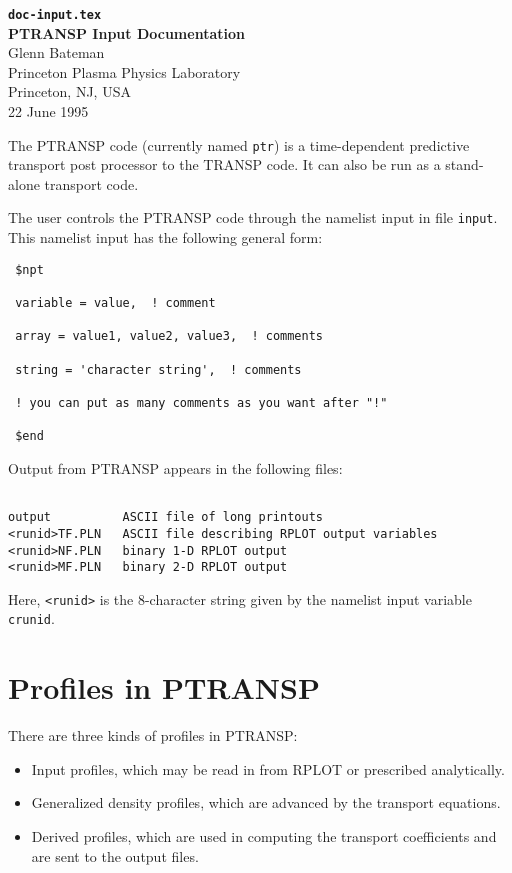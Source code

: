 \headheight 0pt  \headsep 0pt  \topmargin 0pt  \oddsidemargin 0pt
\textheight 9.0in  \textwidth 6.5in
\renewcommand{\arraystretch}{2.0}

\begin{center} 
{\bf {\tt doc-input.tex} \\
PTRANSP Input Documentation} \\
\vspace{1pc} Glenn Bateman \\
Princeton Plasma Physics Laboratory \\ Princeton, NJ, USA \\
22 June 1995
\end{center}

The PTRANSP code (currently named {\tt ptr}) 
is a time-dependent predictive transport post
processor to the TRANSP code.  It can also be run as a stand-alone
transport code.

The user controls the PTRANSP code through the namelist input in file
{\tt input}.  This namelist input has the following general form:
\begin{verbatim}
 $npt
 
 variable = value,  ! comment
 
 array = value1, value2, value3,  ! comments
 
 string = 'character string',  ! comments
 
 ! you can put as many comments as you want after "!"
 
 $end
\end{verbatim}

Output from PTRANSP appears in the following files:
\begin{verbatim}

output          ASCII file of long printouts
<runid>TF.PLN   ASCII file describing RPLOT output variables
<runid>NF.PLN   binary 1-D RPLOT output
<runid>MF.PLN   binary 2-D RPLOT output

\end{verbatim}
Here, {\tt <runid>} is the 8-character string given by the namelist
input variable {\tt crunid}.


\section{Profiles in PTRANSP}

There are three kinds of profiles in PTRANSP:
\begin{itemize}
\item Input profiles, which may be read in from RPLOT or prescribed
analytically.
\item Generalized density profiles, which are advanced by the transport
equations.
\item Derived profiles, which are used in computing the transport
coefficients and are sent to the output files.
\end{itemize}

